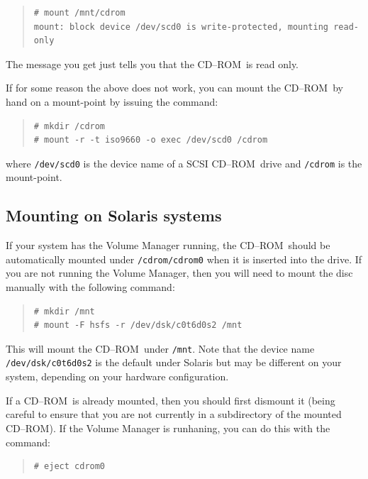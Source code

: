\documentclass[twoside,11pt]{article}
\newcommand{\xlabel}[1]{}
\renewcommand{\_}{\texttt{\symbol{95}}}
\newcommand{\cdrom}{CD--ROM}
\newcommand{\cdrom}{CD-ROM}
\begin{document}
\begin{quote}
\begin{verbatim}
# mount /mnt/cdrom
mount: block device /dev/scd0 is write-protected, mounting read-only
\end{verbatim}
\end{quote}
The message you get just tells you that the \cdrom\ is read only.

If for some reason the above does not work, you can mount the \cdrom\ by
hand on a mount-point by issuing the command:

\begin{quote}
\begin{verbatim}
# mkdir /cdrom
# mount -r -t iso9660 -o exec /dev/scd0 /cdrom
\end{verbatim}
\end{quote}

where \texttt{/dev/scd0} is the device name of a SCSI \cdrom\ drive and
\texttt{/cdrom} is the mount-point.

\subsection{\xlabel{mounting_on_solaris}Mounting on Solaris systems}
\label{mounting_on_solaris}

If your system has the Volume Manager running, the \cdrom\ should be
automatically mounted under \texttt{/cdrom/cdrom0} when it is inserted
into the drive.  If you are not running the Volume Manager, then you
will need to mount the disc manually with the following command:

\begin{quote}
\begin{verbatim}
# mkdir /mnt
# mount -F hsfs -r /dev/dsk/c0t6d0s2 /mnt
\end{verbatim}
\end{quote}

This will mount the \cdrom\ under \texttt{/mnt}.  Note that the device
name \texttt{/dev/dsk/c0t6d0s2} is the default under Solaris but
may be different on your system, depending on your hardware
configuration.

If a \cdrom\ is already mounted, then you should first dismount it
(being careful to ensure that you are not currently in a subdirectory
of the mounted \cdrom).  If the Volume Manager is runhaning, you can do
this with the command:

\begin{quote}
\begin{verbatim}
# eject cdrom0
\end{verbatim}
\end{quote}
\end{document}
